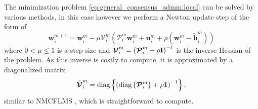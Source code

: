 \documentclass{article}
\newcommand{\hf}{\underline{\bm{h}}}
\newcommand{\wf}{\underline{\bm{w}}}
\newcommand{\uuf}{\underline{\bm{u}}}
\newcommand{\aRhof}{\bm{\mathcal{P}}}
\newcommand{\I}{\mtxb{I}}
\begin{document}
The minimization problem \eqref{eq:general_consensus_admm:local} can be solved by various methods, in this case however we perform a Newton update step of the form of
\begin{equation}
    \wf_i^{m+1} = \wf_i^{m} - \mu \bm{\mathcal{V}}_i^m \left( \aRhof_i^m \wf_i^m + \uuf_i^m + \rho\left(\wf_i^m - \tilde{\hf}_i^{m}\right)\right)\label{eq:online_admm:local_update}
\end{equation}
where \(0  <\mu\leq 1\) is a step size and \(\bm{\mathcal{V}}_i^m = \left(\aRhof_i^m + \rho \I \right)^{-1}\) is the inverse Hessian of the problem.
As this inverse is costly to compute, it is approximated by a diagonalized matrix
\begin{equation}
    \tilde{\bm{\mathcal{V}}}_i^m = \operatorname{diag} \left\{ \left( \operatorname{diag} \left\{ \aRhof_i^m \right\} + \rho \mtxb{1} \right)^{-1}\right\},
\end{equation}
similar to NMCFLMS \cite{}, which is straightforward to compute.
\end{document}
